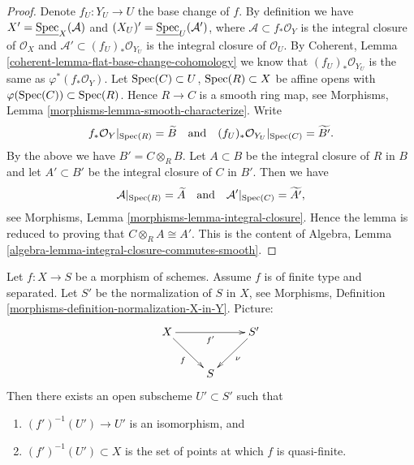\begin{proof}
Denote $f_U : Y_U \to U$ the base change of $f$.
By definition we have
$X' = \underline{\mathop{\rm Spec}}_X(\mathcal{A})$ and
$(X_U)' = \underline{\mathop{\rm Spec}}_U(\mathcal{A}')$, where
$\mathcal{A} \subset f_*\mathcal{O}_Y$ is the integral closure of
$\mathcal{O}_X$ and $\mathcal{A}' \subset (f_U)_*\mathcal{O}_{Y_U}$
is the integral closure of $\mathcal{O}_U$.
By Coherent, Lemma \ref{coherent-lemma-flat-base-change-cohomology}
we know that $(f_U)_*\mathcal{O}_{Y_U}$ is the same as
$\varphi^*(f_*\mathcal{O}_Y)$.
Let $\mathop{\rm Spec}(C) \subset U$, $\mathop{\rm Spec}(R) \subset X$ be
affine opens with $\varphi(\mathop{\rm Spec}(C)) \subset \mathop{\rm Spec}(R)$.
Hence $R \to C$ is a smooth ring map, see
Morphisms, Lemma \ref{morphisms-lemma-smooth-characterize}.
Write
$$
f_*\mathcal{O}_Y|_{\mathop{\rm Spec}(R)} = \widetilde{B}
\quad\text{and}\quad
(f_U)_*\mathcal{O}_{Y_U}|_{\mathop{\rm Spec}(C)} = \widetilde{B'}.
$$
By the above we have $B' = C \otimes_R B$. Let $A \subset B$ be
the integral closure of $R$ in $B$ and let $A' \subset B'$ be the
integral closure of $C$ in $B'$. Then we have
$$
\mathcal{A}|_{\mathop{\rm Spec}(R)} = \widetilde{A}
\quad\text{and}\quad
\mathcal{A}'|_{\mathop{\rm Spec}(C)} = \widetilde{A'},
$$
see Morphisms, Lemma \ref{morphisms-lemma-integral-closure}.
Hence the lemma is reduced to proving that $C \otimes_R A \cong A'$.
This is the content of
Algebra, Lemma \ref{algebra-lemma-integral-closure-commutes-smooth}.
\end{proof}

\begin{lemma}
\label{lemma-finite-type-separated}
Let $f : X \to S$ be a morphism of schemes.
Assume $f$ is of finite type and separated.
Let $S'$ be the normalization of $S$ in $X$, see
Morphisms, Definition \ref{morphisms-definition-normalization-X-in-Y}.
Picture:
$$
\xymatrix{
X \ar[rd]_f \ar[rr]_{f'} & & S' \ar[ld]^\nu \\
& S &
}
$$
Then there exists an open subscheme $U' \subset S'$ such that
\begin{enumerate}
\item $(f')^{-1}(U') \to U'$ is an isomorphism, and
\item $(f')^{-1}(U') \subset X$ is the set of points at which
$f$ is quasi-finite.
\end{enumerate}
\end{lemma}

